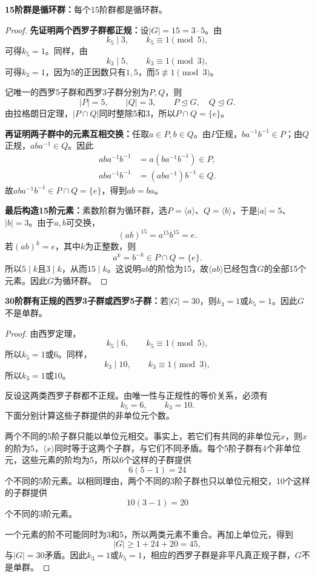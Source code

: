 \begin{example}
\textbf{15阶群是循环群：}每个15阶群都是循环群。
\end{example}
\begin{proof}
\textbf{先证明两个西罗子群都正规：}设$|G|=15=3\cdot5$。由
\[
k_5\mid3,\qquad k_5\equiv1\pmod5,
\]
可得$k_5=1$。同样，由
\[
k_3\mid5,\qquad k_3\equiv1\pmod3,
\]
可得$k_3=1$，因为$5$的正因数只有$1,5$，而$5\not\equiv1\pmod3$。

记唯一的西罗5子群和西罗3子群分别为$P,Q$，则
\[
|P|=5,\qquad |Q|=3,\qquad P\trianglelefteq G,\quad Q\trianglelefteq G.
\]
由拉格朗日定理，$|P\cap Q|$同时整除5和3，所以$P\cap Q=\{e\}$。

\textbf{再证明两子群中的元素互相交换：}任取$a\in P,b\in Q$。由$P$正规，$ba^{-1}b^{-1}\in P$；由$Q$正规，$aba^{-1}\in Q$。因此
\begin{align*}
aba^{-1}b^{-1}&=a(ba^{-1}b^{-1})\in P,\\
aba^{-1}b^{-1}&=(aba^{-1})b^{-1}\in Q.
\end{align*}
故$aba^{-1}b^{-1}\in P\cap Q=\{e\}$，得到$ab=ba$。

\textbf{最后构造15阶元素：}素数阶群为循环群，选$P=\langle a\rangle$、$Q=\langle b\rangle$，于是$|a|=5$、$|b|=3$。由于$a,b$可交换，
\[
(ab)^{15}=a^{15}b^{15}=e.
\]
若$(ab)^k=e$，其中$k$为正整数，则
\[
a^k=b^{-k}\in P\cap Q=\{e\}.
\]
所以$5\mid k$且$3\mid k$，从而$15\mid k$。这说明$ab$的阶恰为15，故$\langle ab\rangle$已经包含$G$的全部15个元素。因此$G$为循环群。
\end{proof}

\begin{example}
\textbf{30阶群有正规的西罗3子群或西罗5子群：}若$|G|=30$，则$k_3=1$或$k_5=1$。因此$G$不是单群。
\end{example}
\begin{proof}
由西罗定理，
\[
k_5\mid6,\qquad k_5\equiv1\pmod5,
\]
所以$k_5=1$或$6$。同样，
\[
k_3\mid10,\qquad k_3\equiv1\pmod3,
\]
所以$k_3=1$或$10$。

反设这两类西罗子群都不正规。由唯一性与正规性的等价关系，必须有
\[
k_5=6,\qquad k_3=10.
\]
下面分别计算这些子群提供的非单位元个数。

两个不同的5阶子群只能以单位元相交。事实上，若它们有共同的非单位元$x$，则$x$的阶为5，$\langle x\rangle$同时等于这两个子群，与它们不同矛盾。每个5阶子群有4个非单位元，这些元素的阶均为5，所以6个这样的子群提供
\[
6(5-1)=24
\]
个不同的5阶元素。以相同理由，两个不同的3阶子群也只以单位元相交，10个这样的子群提供
\[
10(3-1)=20
\]
个不同的3阶元素。

一个元素的阶不可能同时为3和5，所以两类元素不重合。再加上单位元，得到
\[
|G|\ge1+24+20=45,
\]
与$|G|=30$矛盾。因此$k_3=1$或$k_5=1$，相应的西罗子群是非平凡真正规子群，$G$不是单群。
\end{proof}

